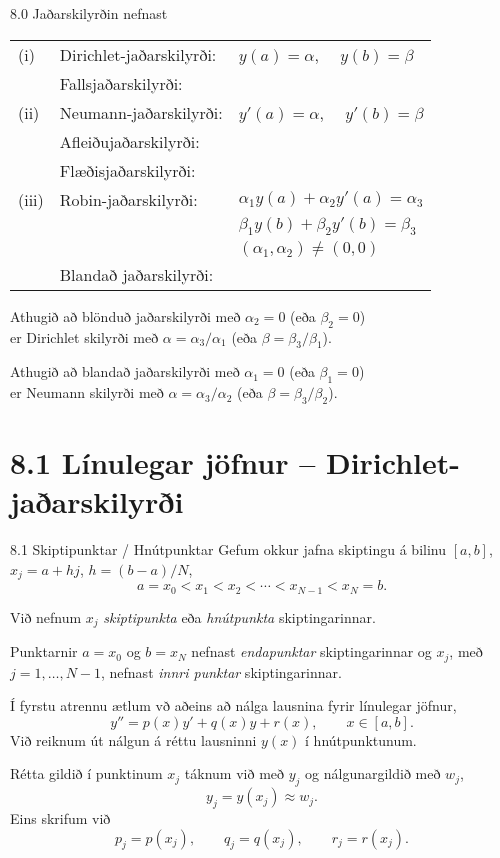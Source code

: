 \begin{frame}{8.0 Jaðarskilyrðin nefnast}
\begin{tabular}{lll}
(i)  &Dirichlet-jaðarskilyrði: &  $y(a)=\alpha$, \ \  $y(b)=\beta$\\
&Fallsjaðarskilyrði: \\
(ii)&Neumann-jaðarskilyrði: 
& $y'(a)=\alpha$, \ \  $y'(b)=\beta$\\
&Afleiðujaðarskilyrði:\\
&Flæðisjaðarskilyrði:\\
(iii)&Robin-jaðarskilyrði: 
&$\alpha_1y(a)+\alpha_2 y'(a)=\alpha_3$ \\ 
&&$\beta_1 y(b)+\beta_2y'(b)=\beta_3$\\
&&$(\alpha_1,\alpha_2)\neq (0,0)$\\
&Blandað jaðarskilyrði:
\end{tabular}

\bigskip
Athugið að blönduð jaðarskilyrði með $\alpha_2=0$ (eða $\beta_2=0$)\\
er Dirichlet skilyrði með 
$\alpha=\alpha_3/\alpha_1$ (eða $\beta=\beta_3/\beta_1$).

\smallskip
Athugið að blandað jaðarskilyrði með $\alpha_1=0$ (eða $\beta_1=0$)\\
er  Neumann skilyrði með 
$\alpha=\alpha_3/\alpha_2$ (eða $\beta=\beta_3/\beta_2$).
\end{frame}


\section*{8.1 Línulegar jöfnur -- Dirichlet-jaðarskilyrði}
\begin{frame}{8.1 Skiptipunktar / Hnútpunktar} 
Gefum okkur jafna skiptingu á bilinu $[a,b]$, $x_j=a+hj$, 
$h=(b-a)/N$,
$$
a=x_0<x_1<x_2<\cdots<x_{N-1}<x_N=b.
$$

\pause
Við nefnum $x_j$  {\it skiptipunkta} eða {\it hnútpunkta} skiptingarinnar.  

\pause
\smallskip
Punktarnir $a=x_0$ og $b=x_N$ nefnast {\it endapunktar}
skiptingarinnar og $x_j$, með $j=1,\dots,N-1$, 
nefnast {\it innri punktar} skiptingarinnar.

\pause
\smallskip
Í fyrstu atrennu ætlum vð aðeins að nálga lausnina fyrir
línulegar jöfnur,
$$
y''=p(x)y'+q(x)y+r(x), \qquad x\in [a,b].
$$
Við reiknum út nálgun á réttu lausninni $y(x)$ í
hnútpunktunum. 

\pause
\smallskip
Rétta gildið í punktinum $x_j$ táknum við með $y_j$ og nálgunargildið
með $w_j$, 
$$
y_j=y(x_j)\approx w_j.
$$ 
Eins skrifum við 
$$
p_j=p(x_j), \qquad q_j=q(x_j), \qquad  r_j=r(x_j).
$$
\end{frame}

